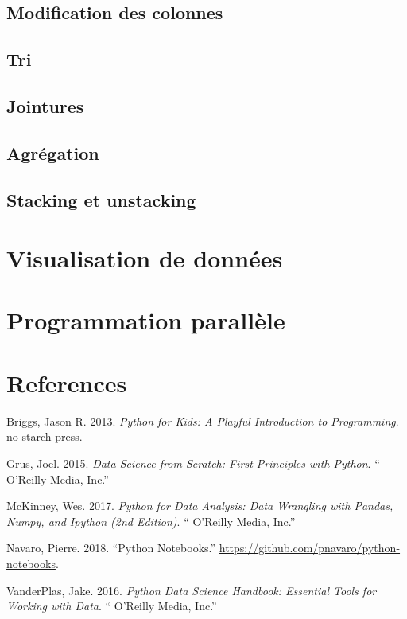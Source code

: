 \documentclass[12pt,]{book}
\numberwithin{equation}{section}
\numberwithin{countremarque}{section}
\begin{document}
\section{Modification des colonnes}\label{modification-des-colonnes}

\section{Tri}\label{tri-1}

\section{Jointures}\label{jointures}

\section{Agrégation}\label{agregation}

\section{Stacking et unstacking}\label{stacking-et-unstacking}

\chapter{Visualisation de données}\label{visualisation-de-donnees}

\chapter{Programmation parallèle}\label{programmation-parallele}

\chapter{References}\label{references}

\hypertarget{refs}{}
\hypertarget{ref-briggs_2013_python}{}
Briggs, Jason R. 2013. \emph{Python for Kids: A Playful Introduction to
Programming}. no starch press.

\hypertarget{ref-grus_2015_data}{}
Grus, Joel. 2015. \emph{Data Science from Scratch: First Principles with
Python}. `` O'Reilly Media, Inc.''

\hypertarget{ref-mckinney_2017_python}{}
McKinney, Wes. 2017. \emph{Python for Data Analysis: Data Wrangling with
Pandas, Numpy, and Ipython (2nd Edition)}. `` O'Reilly Media, Inc.''

\hypertarget{ref-navaro_python}{}
Navaro, Pierre. 2018. ``Python Notebooks.''
\url{https://github.com/pnavaro/python-notebooks}.

\hypertarget{ref-vanderplas2016python}{}
VanderPlas, Jake. 2016. \emph{Python Data Science Handbook: Essential
Tools for Working with Data}. `` O'Reilly Media, Inc.''
\end{document}
